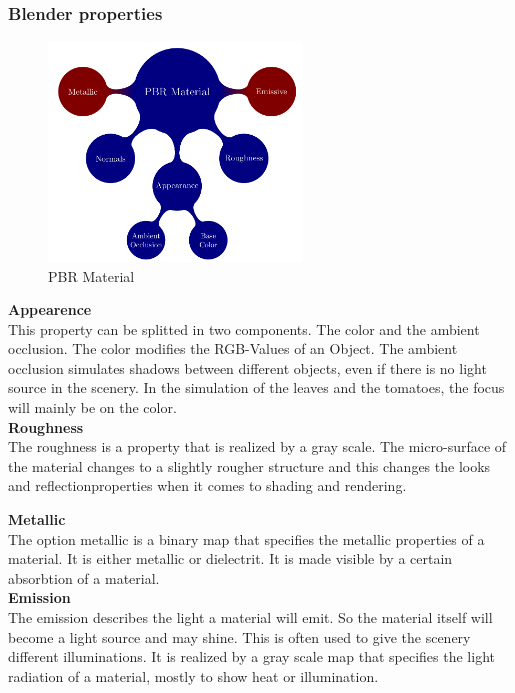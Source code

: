 \subsubsection{Blender properties}
\begin{figure}[h]
	\centering
	\includegraphics[width=0.6\textwidth]{blender_properties.png}
	\caption{PBR Material}
	\label{pbr}
\end{figure}
\textbf{Appearence}\\
This property can be splitted in two components. The color and the ambient occlusion. The color modifies the RGB-Values of an Object. The ambient occlusion simulates shadows between different objects, even if there is no light source in the scenery. In the simulation of the leaves and the tomatoes, the focus will mainly be on the color.\\


\textbf{Roughness}\\
The roughness is a property that is realized by a gray scale. The micro-surface of the material changes to a slightly rougher structure and this changes the looks and reflectionproperties when it comes to shading and rendering. \newline

\textbf{Metallic}\\
The option metallic is a binary map that specifies the metallic properties of a material. It is either metallic or dielectrit. It is made visible by a certain absorbtion of a material.\\


\textbf{Emission} \\
The emission describes the light a material will emit. So the material itself will become a light source and may shine. This is often used to give the scenery different illuminations. It is realized by a gray scale map that specifies the light radiation of a material, mostly to show heat or illumination.\\


